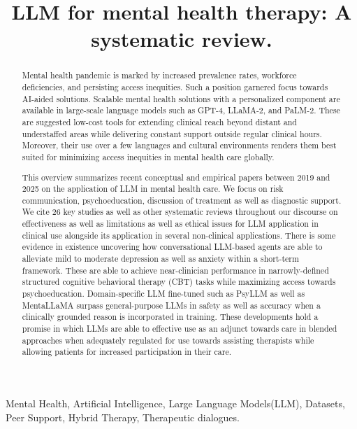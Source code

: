 \documentclass[journal]{IEEEtran}
\title{LLM for mental health therapy: A systematic review.}
\author{
\IEEEauthorblockN{
Pooja Patel\IEEEauthorrefmark{1},
Namrata Patel\IEEEauthorrefmark{2}
}
\IEEEauthorblockA{
Dept of CSE, Parul University, Vadodara, India \\
Email: \IEEEauthorrefmark{1}2303031059003@paruluniversity.ac.in,
\IEEEauthorrefmark{2}namrata.patel@paruluniversity.ac.in
}
}
\begin{document}
\maketitle

\begin{abstract}
Mental health pandemic is marked by increased prevalence rates, workforce deficiencies, and persisting access inequities. Such a position garnered focus towards AI-aided solutions. Scalable mental health solutions with a personalized component are available in large-scale language models such as GPT-4, LLaMA-2, and PaLM-2. These are suggested low-cost tools for extending clinical reach beyond distant and understaffed areas while delivering constant support outside regular clinical hours. Moreover, their use over a few languages and cultural environments renders them best suited for minimizing access inequities in mental health care globally.

This overview summarizes recent conceptual and empirical papers between 2019 and 2025 on the application of LLM in mental health care. We focus on risk communication, psychoeducation, discussion of treatment as well as diagnostic support. We cite 26 key studies as well as other systematic reviews throughout our discourse on effectiveness as well as limitations as well as ethical issues for LLM application in clinical use alongside its application in several non-clinical applications. There is some evidence in existence uncovering how conversational LLM-based agents are able to alleviate mild to moderate depression as well as anxiety within a short-term framework. These are able to achieve near-clinician performance in narrowly-defined structured cognitive behavioral therapy (CBT) tasks while maximizing access towards psychoeducation. Domain-specific LLM fine-tuned such as PsyLLM as well as MentaLLaMA surpass general-purpose LLMs in safety as well as accuracy when a clinically grounded reason is incorporated in training. These developments hold a promise in which LLMs are able to effective use as an adjunct towards care in blended approaches when adequately regulated for use towards assisting therapists while allowing patients for increased participation in their care.

\end{abstract}

\begin{IEEEkeywords}
Mental Health, Artificial Intelligence, Large Language Models(LLM), Datasets, Peer Support, Hybrid Therapy, Therapeutic dialogues.
\end{IEEEkeywords}
\end{document}
